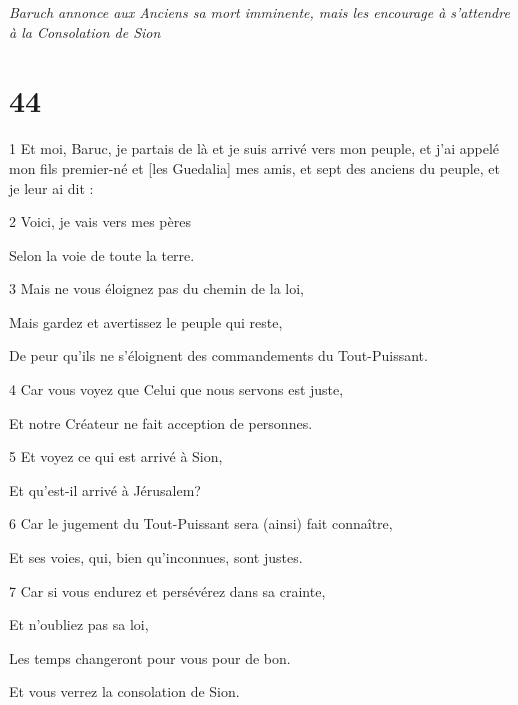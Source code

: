 \par \textit{Baruch annonce aux Anciens sa mort imminente, mais les encourage à s'attendre à la Consolation de Sion}

\chapter{44}

\par 1 Et moi, Baruc, je partais de là et je suis arrivé vers mon peuple, et j'ai appelé mon fils premier-né et [les Guedalia] mes amis, et sept des anciens du peuple, et je leur ai dit :

\par 2 Voici, je vais vers mes pères

\par Selon la voie de toute la terre.

\par 3 Mais ne vous éloignez pas du chemin de la loi,

\par Mais gardez et avertissez le peuple qui reste,

\par De peur qu'ils ne s'éloignent des commandements du Tout-Puissant.

\par 4 Car vous voyez que Celui que nous servons est juste,

\par Et notre Créateur ne fait acception de personnes.

\par 5 Et voyez ce qui est arrivé à Sion,

\par Et qu'est-il arrivé à Jérusalem?

\par 6 Car le jugement du Tout-Puissant sera (ainsi) fait connaître,

\par Et ses voies, qui, bien qu'inconnues, sont justes.

\par 7 Car si vous endurez et persévérez dans sa crainte,

\par Et n'oubliez pas sa loi,

\par Les temps changeront pour vous pour de bon.

\par Et vous verrez la consolation de Sion.

